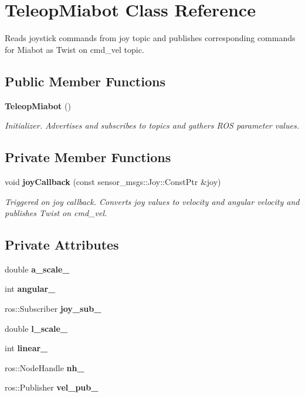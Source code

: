 \section{\-Teleop\-Miabot \-Class \-Reference}
\label{classTeleopMiabot}


\-Reads joystick commands from joy topic and publishes corresponding commands for \-Miabot as \-Twist on cmd\-\_\-vel topic.  


\subsection*{\-Public \-Member \-Functions}
\begin{DoxyCompactItemize}
\item 
{\bf \-Teleop\-Miabot} ()
\begin{DoxyCompactList}\small\item\em \-Initializer. \-Advertises and subscribes to topics and gathers \-R\-O\-S parameter values. \end{DoxyCompactList}\end{DoxyCompactItemize}
\subsection*{\-Private \-Member \-Functions}
\begin{DoxyCompactItemize}
\item 
void {\bf joy\-Callback} (const sensor\-\_\-msgs\-::\-Joy\-::\-Const\-Ptr \&joy)
\begin{DoxyCompactList}\small\item\em \-Triggered on joy callback. \-Converts joy values to velocity and angular velocity and publishes \-Twist on cmd\-\_\-vel. \end{DoxyCompactList}\end{DoxyCompactItemize}
\subsection*{\-Private \-Attributes}
\begin{DoxyCompactItemize}
\item 
double {\bf a\-\_\-scale\-\_\-}
\item 
int {\bf angular\-\_\-}
\item 
ros\-::\-Subscriber {\bf joy\-\_\-sub\-\_\-}
\item 
double {\bf l\-\_\-scale\-\_\-}
\item 
int {\bf linear\-\_\-}
\item 
ros\-::\-Node\-Handle {\bf nh\-\_\-}
\item 
ros\-::\-Publisher {\bf vel\-\_\-pub\-\_\-}
\end{DoxyCompactItemize}


